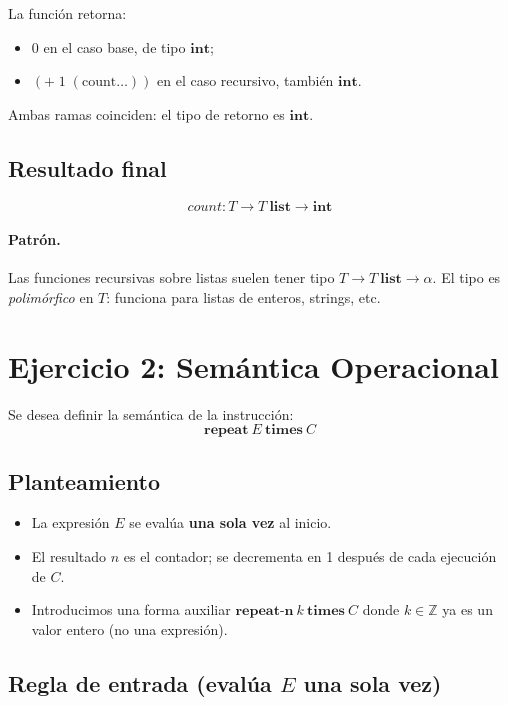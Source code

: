 \documentclass[11pt]{article}
\begin{document}
La función retorna:
\begin{itemize}
    \item $0$ en el caso base, de tipo $\mathbf{int}$;
    \item $(+ \; 1 \; (\text{count} \ldots))$ en el caso recursivo, también
          $\mathbf{int}$.
\end{itemize}

Ambas ramas coinciden: el tipo de retorno es $\mathbf{int}$.

\subsection*{Resultado final}

\[
  count : T \rightarrow T\ \mathbf{list} \rightarrow \mathbf{int}
\]

\paragraph{Patrón.} Las funciones recursivas sobre listas suelen tener
  tipo $T \to T\ \mathbf{list} \to \alpha$.
  El tipo es \emph{polimórfico} en $T$: funciona para listas de enteros,
  strings, etc.


\section{Ejercicio 2: Semántica Operacional}


Se desea definir la semántica de la instrucción:
\[
  \mathbf{repeat}\ E\ \mathbf{times}\ C
\]

\subsection*{Planteamiento}

\begin{itemize}
    \item La expresión $E$ se evalúa \textbf{una sola vez} al inicio.
    \item El resultado $n$ es el contador; se decrementa en 1 después de
          cada ejecución de $C$.
    \item Introducimos una forma auxiliar
          $\mathbf{repeat\text{-}n}\ k\ \mathbf{times}\ C$
          donde $k \in \mathbb{Z}$ ya es un valor entero (no una expresión).
\end{itemize}

\subsection*{Regla de entrada (evalúa $E$ una sola vez)}
\end{document}
